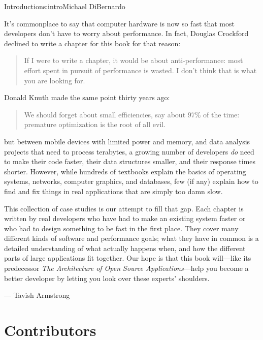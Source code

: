 \begin{aosachapter}{Introduction}{s:intro}{Michael DiBernardo}

It's commonplace to say that
computer hardware is now so fast
that most developers don't have to worry about performance. 
In fact,
Douglas Crockford declined to write a chapter for this book for that reason:

\begin{quote}
If I were to write a chapter, it would be about anti-performance:
most effort spent in pursuit of performance is wasted.
I don't think that is what you are looking for.
\end{quote}

\noindent
Donald Knuth made the same point thirty years ago:

\begin{quote}
We should forget about small efficiencies, say about 97\% of the time:
premature optimization is the root of all evil.
\end{quote}

\noindent
but between mobile devices with limited power and memory,
and data analysis projects that need to process terabytes,
a growing number of developers \emph{do} need to make their code faster,
their data structures smaller,
and their response times shorter.
However,
while hundreds of textbooks explain the basics of operating systems,
networks,
computer graphics,
and databases,
few (if any) explain how to find and fix things
in real applications
that are simply too damn slow.

This collection of case studies is our attempt to fill that gap.
Each chapter is written by real developers
who have had to make an existing system faster
or who had to design something to be fast in the first place.
They cover many different kinds of software and performance goals;
what they have in common is a detailed understanding of what actually happens when,
and how the different parts of large applications fit together.
Our hope is that this book will---like its predecessor \emph{The Architecture of Open Source Applications}---help
you become a better developer
by letting you look over these experts' shoulders.

\hspace{6cm} --- Tavish Armstrong

\section*{Contributors}


\end{aosachapter}
